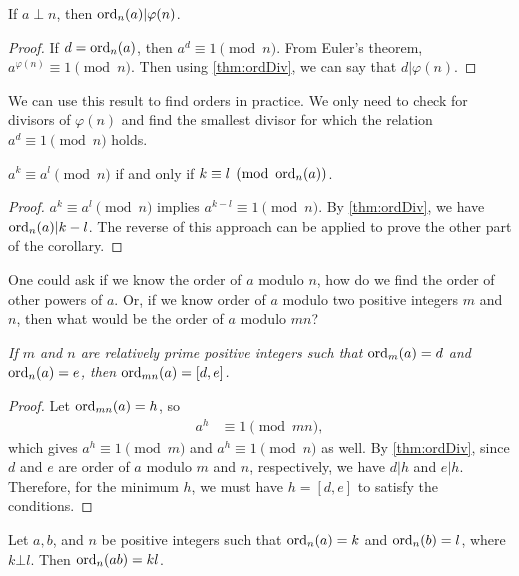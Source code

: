 \documentclass{subfile}
\begin{document}
	\begin{corollary}\label{cor:phiDiv}
		If $a\perp n$, then $\operatorname{ord}_n(a)|\varphi (n)$.
	\end{corollary}

	\begin{proof}
		If $d=\operatorname{ord}_n(a)$, then $a^d\equiv1\pmod n$. From Euler's theorem, $a^{\varphi (n)}\equiv1\pmod n$. Then using \autoref{thm:ordDiv}, we can say that $d|\varphi (n)$.
	\end{proof}
We can use this result to find orders in practice. We only need to check for divisors of $\varphi(n)$ and find the smallest divisor for which the relation $a^d\equiv1\pmod n$ holds.
	\begin{corollary}
		$a^k\equiv a^l\pmod n$ if and only if $k\equiv l\pmod{\operatorname{ord}_n(a)}$.
	\end{corollary}

	\begin{proof}
		$a^k\equiv a^l\pmod n$ implies $a^{k-l} \equiv 1 \pmod n$. By \autoref{thm:ordDiv}, we have $\operatorname{ord}_n(a) | k-l$. The reverse of this approach can be applied to prove the other part of the corollary.
	\end{proof}
One could ask if we know the order of $a$ modulo $n$, how do we find the order of other powers of $a$. Or, if we know order of $a$ modulo two positive integers $m$ and $n$, then what would be the order of $a$ modulo $mn$?
	\begin{theorem}\slshape
		If $m$ and $n$ are relatively prime positive integers such that $\operatorname{ord}_m(a)=d$ and $\operatorname{ord}_n(a)=e$, then $\operatorname{ord}_{mn}(a)=[d,e]$.\label{thm:ordL}
	\end{theorem}

	\begin{proof}
		Let $\operatorname{ord}_{mn}(a)=h$, so
			\begin{align*}
				a^h
					& \equiv1\pmod {mn},
			\end{align*}
		which gives $a^h\equiv1\pmod m$ and $a^h\equiv1\pmod n$ as well. By \autoref{thm:ordDiv}, since $d$ and $e$ are order of $a$ modulo $m$ and $n$, respectively, we have $d|h$ and $e|h$. Therefore, for the minimum $h$, we must have $h=[d,e]$ to satisfy the conditions.
	\end{proof}

	\begin{theorem}\label{thm:prproduct}
		Let $a,b$, and $n$ be positive integers such that $\operatorname{ord}_n(a)=k$ and $\operatorname{ord}_n(b)=l$, where $k\bot l$. Then $\operatorname{ord}_n(ab)=kl$.
	\end{theorem}
\end{document}
